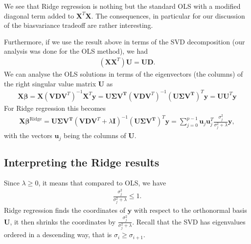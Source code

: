\documentclass[letterpaper,10pt,english]{sphinxmanual}
\begin{document}
We see that Ridge regression is nothing but the standard
OLS with a modified diagonal term added to \(\boldsymbol{X}^T\boldsymbol{X}\). The
consequences, in particular for our discussion of the bias\sphinxhyphen{}variance tradeoff
are rather interesting.

Furthermore, if we use the result above in terms of the SVD decomposition (our analysis was done for the OLS method), we had
\begin{equation*}
\begin{split}
(\boldsymbol{X}\boldsymbol{X}^T)\boldsymbol{U} = \boldsymbol{U}\boldsymbol{D}.
\end{split}
\end{equation*}
We can  analyse the OLS solutions in terms of the eigenvectors (the columns) of the right singular value matrix \(\boldsymbol{U}\) as
\begin{equation*}
\begin{split}
\boldsymbol{X}\boldsymbol{\beta} = \boldsymbol{X}\left(\boldsymbol{V}\boldsymbol{D}\boldsymbol{V}^T \right)^{-1}\boldsymbol{X}^T\boldsymbol{y}=\boldsymbol{U\Sigma V^T}\left(\boldsymbol{V}\boldsymbol{D}\boldsymbol{V}^T \right)^{-1}(\boldsymbol{U\Sigma V^T})^T\boldsymbol{y}=\boldsymbol{U}\boldsymbol{U}^T\boldsymbol{y}
\end{split}
\end{equation*}
For Ridge regression this becomes
\begin{equation*}
\begin{split}
\boldsymbol{X}\boldsymbol{\beta}^{\mathrm{Ridge}} = \boldsymbol{U\Sigma V^T}\left(\boldsymbol{V}\boldsymbol{D}\boldsymbol{V}^T+\lambda\boldsymbol{I} \right)^{-1}(\boldsymbol{U\Sigma V^T})^T\boldsymbol{y}=\sum_{j=0}^{p-1}\boldsymbol{u}_j\boldsymbol{u}_j^T\frac{\sigma_j^2}{\sigma_j^2+\lambda}\boldsymbol{y},
\end{split}
\end{equation*}
with the vectors \(\boldsymbol{u}_j\) being the columns of \(\boldsymbol{U}\).


\subsection{Interpreting the Ridge results}
\label{\detokenize{chapter4:interpreting-the-ridge-results}}
Since \(\lambda \geq 0\), it means that compared to OLS, we have
\begin{equation*}
\begin{split}
\frac{\sigma_j^2}{\sigma_j^2+\lambda} \leq 1.
\end{split}
\end{equation*}
Ridge regression finds the coordinates of \(\boldsymbol{y}\) with respect to the
orthonormal basis \(\boldsymbol{U}\), it then shrinks the coordinates by
\(\frac{\sigma_j^2}{\sigma_j^2+\lambda}\). Recall that the SVD has
eigenvalues ordered in a descending way, that is \(\sigma_i \geq
\sigma_{i+1}\).
\end{document}
